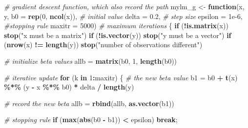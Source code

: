 \documentclass[
]{book}
\newenvironment{Shaded}{\begin{snugshade}}{\end{snugshade}}
\newcommand{\AttributeTok}[1]{\textcolor[rgb]{0.13,0.29,0.53}{#1}}
\newcommand{\CommentTok}[1]{\textcolor[rgb]{0.56,0.35,0.01}{\textit{#1}}}
\newcommand{\ControlFlowTok}[1]{\textcolor[rgb]{0.13,0.29,0.53}{\textbf{#1}}}
\newcommand{\DecValTok}[1]{\textcolor[rgb]{0.00,0.00,0.81}{#1}}
\newcommand{\FloatTok}[1]{\textcolor[rgb]{0.00,0.00,0.81}{#1}}
\newcommand{\FunctionTok}[1]{\textcolor[rgb]{0.13,0.29,0.53}{\textbf{#1}}}
\newcommand{\NormalTok}[1]{#1}
\newcommand{\OtherTok}[1]{\textcolor[rgb]{0.56,0.35,0.01}{#1}}
\newcommand{\SpecialCharTok}[1]{\textcolor[rgb]{0.81,0.36,0.00}{\textbf{#1}}}
\newcommand{\StringTok}[1]{\textcolor[rgb]{0.31,0.60,0.02}{#1}}
\theoremstyle{definition}
\theoremstyle{definition}
\theoremstyle{definition}
\theoremstyle{definition}
\theoremstyle{remark}
\begin{document}
\begin{Shaded}
\begin{Highlighting}[]
  \CommentTok{\# gradient descent function, which also record the path}
\NormalTok{  mylm\_g }\OtherTok{\textless{}{-}} \ControlFlowTok{function}\NormalTok{(x, y, }
                     \AttributeTok{b0 =} \FunctionTok{rep}\NormalTok{(}\DecValTok{0}\NormalTok{, }\FunctionTok{ncol}\NormalTok{(x)), }\CommentTok{\# initial value}
                     \AttributeTok{delta =} \FloatTok{0.2}\NormalTok{, }\CommentTok{\# step size}
                     \AttributeTok{epsilon =} \FloatTok{1e{-}6}\NormalTok{, }\CommentTok{\#stopping rule}
                     \AttributeTok{maxitr =} \DecValTok{5000}\NormalTok{) }\CommentTok{\# maximum iterations}
\NormalTok{  \{}
    \ControlFlowTok{if}\NormalTok{ (}\SpecialCharTok{!}\FunctionTok{is.matrix}\NormalTok{(x)) }\FunctionTok{stop}\NormalTok{(}\StringTok{"x must be a matrix"}\NormalTok{)}
    \ControlFlowTok{if}\NormalTok{ (}\SpecialCharTok{!}\FunctionTok{is.vector}\NormalTok{(y)) }\FunctionTok{stop}\NormalTok{(}\StringTok{"y must be a vector"}\NormalTok{)}
    \ControlFlowTok{if}\NormalTok{ (}\FunctionTok{nrow}\NormalTok{(x) }\SpecialCharTok{!=} \FunctionTok{length}\NormalTok{(y)) }\FunctionTok{stop}\NormalTok{(}\StringTok{"number of observations different"}\NormalTok{)}
    
    \CommentTok{\# initialize beta values}
\NormalTok{    allb }\OtherTok{=} \FunctionTok{matrix}\NormalTok{(b0, }\DecValTok{1}\NormalTok{, }\FunctionTok{length}\NormalTok{(b0))}

    \CommentTok{\# iterative update}
    \ControlFlowTok{for}\NormalTok{ (k }\ControlFlowTok{in} \DecValTok{1}\SpecialCharTok{:}\NormalTok{maxitr)}
\NormalTok{    \{}
      \CommentTok{\# the new beta value}
\NormalTok{      b1 }\OtherTok{=}\NormalTok{ b0 }\SpecialCharTok{+} \FunctionTok{t}\NormalTok{(x) }\SpecialCharTok{\%*\%}\NormalTok{ (y }\SpecialCharTok{{-}}\NormalTok{ x }\SpecialCharTok{\%*\%}\NormalTok{ b0) }\SpecialCharTok{*}\NormalTok{ delta }\SpecialCharTok{/} \FunctionTok{length}\NormalTok{(y)      }

      \CommentTok{\# record the new beta}
\NormalTok{      allb }\OtherTok{=} \FunctionTok{rbind}\NormalTok{(allb, }\FunctionTok{as.vector}\NormalTok{(b1))}
      
      \CommentTok{\# stopping rule}
      \ControlFlowTok{if}\NormalTok{ (}\FunctionTok{max}\NormalTok{(}\FunctionTok{abs}\NormalTok{(b0 }\SpecialCharTok{{-}}\NormalTok{ b1)) }\SpecialCharTok{\textless{}}\NormalTok{ epsilon)}
        \ControlFlowTok{break}\NormalTok{;}
      

\end{Highlighting}
\end{Shaded}
\end{document}
